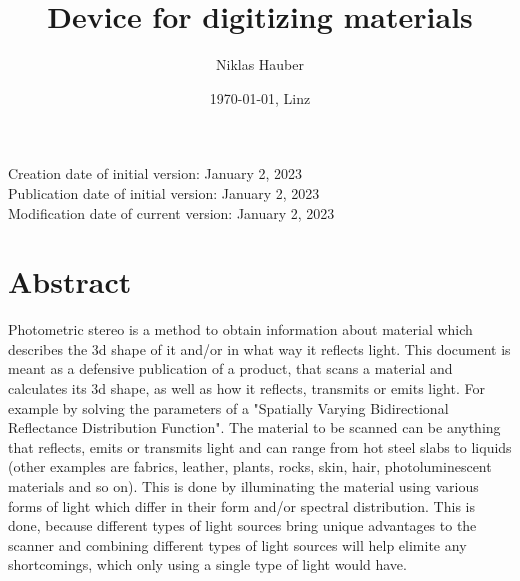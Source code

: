 \documentclass[11pt, twoside, listof=totocnumbered, bibliography=totocnumbered]{scrartcl}
\title{Device for digitizing materials}
\author{Niklas Hauber}
\date{\today{}, Linz}
\begin{document}
\maketitle
Creation date of initial version: January 2, 2023\\
Publication date of initial version: January 2, 2023\\
Modification date of current version: January 2, 2023\\

\section{Abstract}
Photometric stereo is a method to obtain information about material which describes the 3d shape of it and/or in what way it reflects light. This document is meant as a defensive publication of a product, that scans a material and calculates its 3d shape, as well as how it reflects, transmits or emits light. For example by solving the parameters of a "Spatially Varying Bidirectional Reflectance Distribution Function". The material to be scanned can be anything that reflects, emits or transmits light and can range from hot steel slabs to liquids (other examples are fabrics, leather, plants, rocks, skin, hair, photoluminescent materials and so on). This is done by illuminating the material using various forms of light which differ in their form and/or spectral distribution. This is done, because different types of light sources bring unique advantages to the scanner and combining different types of light sources will help elimite any shortcomings, which only using a single type of light would have. \cite{SURVEY}
\end{document}
